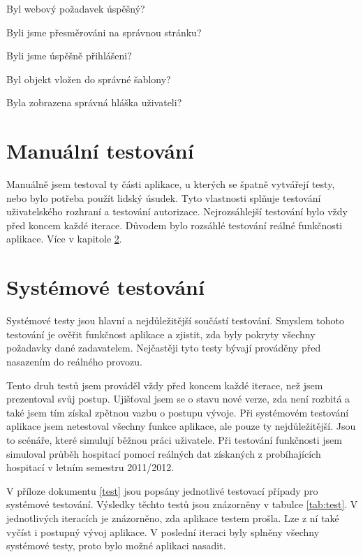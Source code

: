 \begin{list}{•}{\textbf{Tento typ testů testuje:}}
\item Byl webový požadavek úspěšný?
\item Byli jsme přesměrováni na správnou stránku?
\item Byli jsme úspěšně přihlášeni?
\item Byl objekt vložen do správné šablony?
\item Byla zobrazena správná hláška uživateli?
\end{list} 

\section{Manuální testování}
Manuálně jsem testoval ty části aplikace, u kterých se špatně vytvářejí  testy, nebo bylo potřeba použít lidský úsudek. Tyto vlastnosti splňuje testování uživatelského rozhraní a testování autorizace. Nejrozsáhlejší testování bylo vždy před koncem každé iterace. Důvodem bylo rozsáhlé testování reálné funkčnosti aplikace. Více v kapitole \ref{sec:sys_test}.

\section{Systémové testování}
\label{sec:sys_test}
Systémové testy jsou hlavní a nejdůležitější součástí testování. Smyslem tohoto testování
je ověřit funkčnost aplikace a zjistit, zda byly pokryty všechny požadavky dané zadavatelem. Nejčastěji tyto testy bývají prováděny  před nasazením do reálného provozu. 

Tento druh testů jsem prováděl vždy před  
koncem každé iterace, než jsem prezentoval svůj postup. Ujišťoval jsem se o stavu nové verze, zda není rozbitá a také jsem tím získal zpětnou vazbu o postupu vývoje. Při systémovém testování aplikace jsem netestoval všechny funkce aplikace, ale pouze ty nejdůležitější. Jsou to scénáře, které simulují běžnou práci uživatele. Při testování funkčnosti jsem simuloval průběh hospitací pomocí reálných dat získaných z probíhajících hospitací v letním semestru 2011/2012.

V příloze dokumentu \ref{test} jsou popsány jednotlivé testovací případy pro systémové testování. Výsledky těchto testů jsou znázorněny v tabulce \ref{tab:test}. V jednotlivých iteracích je znázorněno, zda aplikace testem prošla. Lze z ní také vyčíst i postupný vývoj aplikace. V poslední iteraci byly splněny všechny systémové testy, proto bylo možné aplikaci nasadit.


